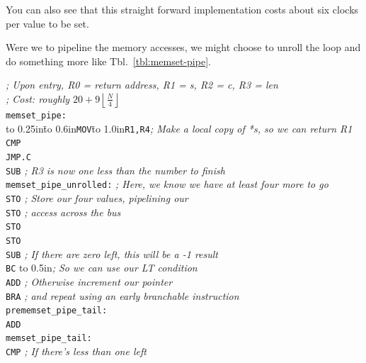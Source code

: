 \documentclass{gqtekspec}
\begin{document}
You can also see that this straight forward implementation costs about
six clocks per value to be set.

Were we to pipeline the memory accesses, we might choose to unroll the loop
and do something more like Tbl.~\ref{tbl:memset-pipe}.
\begin{table}\begin{center}
\begin{tabbing}
{\em ; Upon entry, R0 = return address, R1 = s, R2 = c, R3 = len}\\
{\em ; Cost: roughly $20+9\left\lfloor\frac{N}{4}\right\rfloor$}\\
{\tt memset\_pipe:}\\
\hbox to 0.25in{}\=\hbox to 0.6in{\tt MOV}\=\hbox to 1.0in{\tt R1,R4}\={\em ; Make a local copy of *s, so we can return R1}\\
\>	{\tt CMP}\\
\>	{\tt JMP.C}\\
\>	{\tt SUB}\> {\em ; R3 is now one less than the number to finish}\\
{\tt memset\_pipe\_unrolled:}\>\>\> {\em ; Here, we know we have at least four more to go}\\
\>	{\tt STO} \> {\em  ; Store our four values, pipelining our}\\
\>	{\tt STO} \> {\em ; access across the bus }\\
\>	{\tt STO} \\
\>	{\tt STO} \\
\>	{\tt SUB} \> {\em; If there are zero left, this will be a -1 result}\\
\>	{\tt BC}\> \hbox to 0.5in{}\= {\em; So we can use our LT condition}\\
\>	{\tt ADD} \> {\em ; Otherwise increment our pointer}\\
\>	{\tt BRA} {\em ; and repeat using an early branchable instruction}\\
{\tt prememset\_pipe\_tail:} \\
\>    {\tt ADD}\\
{\tt memset\_pipe\_tail:}\>\>\\
\>	{\tt CMP}	\> {\em ; If there's less than one left}\\

\end{tabbing}
\end{center}
\end{table}
\end{document}
